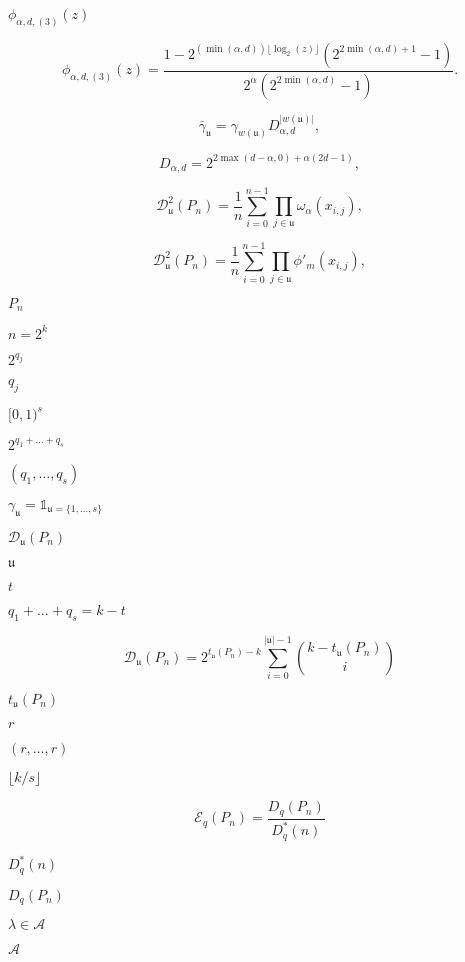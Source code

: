 \documentclass{article}
\begin{document}
$ \phi_{\alpha, d, (3)}(z) $
\pagebreak

\[        \phi_{\alpha, d, (3)}(z) =
        \frac{1 - 2^{(\min(\alpha, d)) \lfloor \log_2(z) \rfloor} (2^{2 \min(\alpha, d) + 1} -1)}{2^{\alpha} (2^{2\min(\alpha, d)} -1) }.
\]
\pagebreak

\[        \bar{\gamma}_{\mathfrak u} = \gamma_{w(\mathfrak u)} D_{\alpha, d}^{|w(\mathfrak u)|},
\]
\pagebreak

\[      D_{\alpha, d} = 2^{2 \max(d-\alpha, 0) + \alpha (2d-1)},
\]
\pagebreak

\[        \mathcal{D}^2_{\mathfrak u}(P_n) = \frac{1}{{n}} \sum_{i = 0}^{n-1} 
        \prod_{j \in \mathfrak u} \omega_{\alpha}(x_{i,j}),
\]
\pagebreak

\[        \mathcal{D}^2_{\mathfrak u}(P_n) = \frac{1}{{n}} \sum_{i = 0}^{n-1} 
        \prod_{j \in \mathfrak u} \phi'_m(x_{i,j}),
\]
\pagebreak

$P_n $
\pagebreak

$n = 2^k$
\pagebreak

$2^{q_j}$
\pagebreak

$q_j$
\pagebreak

$[0,1)^s$
\pagebreak

$2^{q_1+\dots+q_s}$
\pagebreak

$(q_1,\dots,q_s)$
\pagebreak

$\gamma_{\mathfrak u} = \mathbb{1}_{\mathfrak u = \{1, \dots, s\}} $
\pagebreak

$\mathcal{D}_{\mathfrak u}(P_n)$
\pagebreak

$\mathfrak u$
\pagebreak

$t$
\pagebreak

$q_1+\dots+q_s = k-t $
\pagebreak

\[        \mathcal{D}_{\mathfrak u}(P_n) = 2^{t_{\mathfrak u}(P_n)-k} \sum_{i=0}^{|\mathfrak{u}|-1} \binom{k-t_{\mathfrak u}(P_n)}{i}
\]
\pagebreak

$t_{\mathfrak u}(P_n)$
\pagebreak

$r$
\pagebreak

$(r,\dots,r)$
\pagebreak

$\lfloor k/s\rfloor$
\pagebreak

\[\mathcal E_q(P_n) = \frac{D_q(P_n)}{D^\ast_q(n)}
\]
\pagebreak

$D^\ast_q(n)$
\pagebreak

$D_q(P_n)$
\pagebreak

$\lambda \in \mathcal A$
\pagebreak

$\mathcal A$
\pagebreak
\end{document}
